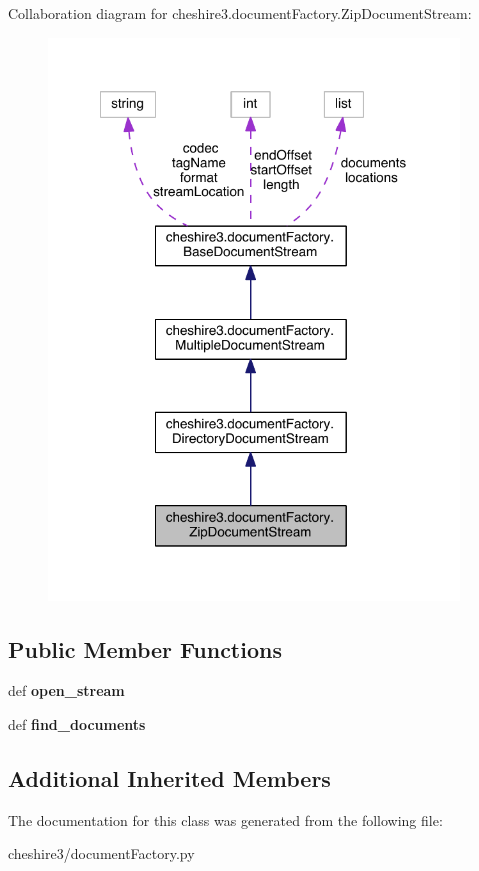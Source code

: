 Collaboration diagram for cheshire3.\-document\-Factory.\-Zip\-Document\-Stream\-:
\nopagebreak
\begin{figure}[H]
\begin{center}
\leavevmode
\includegraphics[width=309pt]{classcheshire3_1_1document_factory_1_1_zip_document_stream__coll__graph}
\end{center}
\end{figure}
\subsection*{Public Member Functions}
\begin{DoxyCompactItemize}
\item 
\hypertarget{classcheshire3_1_1document_factory_1_1_zip_document_stream_ac26f8b653aaefb1b697fce4727e71978}{def {\bfseries open\-\_\-stream}}\label{classcheshire3_1_1document_factory_1_1_zip_document_stream_ac26f8b653aaefb1b697fce4727e71978}

\item 
\hypertarget{classcheshire3_1_1document_factory_1_1_zip_document_stream_a8799c6a3c3552e8689c25b19600af87a}{def {\bfseries find\-\_\-documents}}\label{classcheshire3_1_1document_factory_1_1_zip_document_stream_a8799c6a3c3552e8689c25b19600af87a}

\end{DoxyCompactItemize}
\subsection*{Additional Inherited Members}


The documentation for this class was generated from the following file\-:\begin{DoxyCompactItemize}
\item 
cheshire3/document\-Factory.\-py\end{DoxyCompactItemize}
